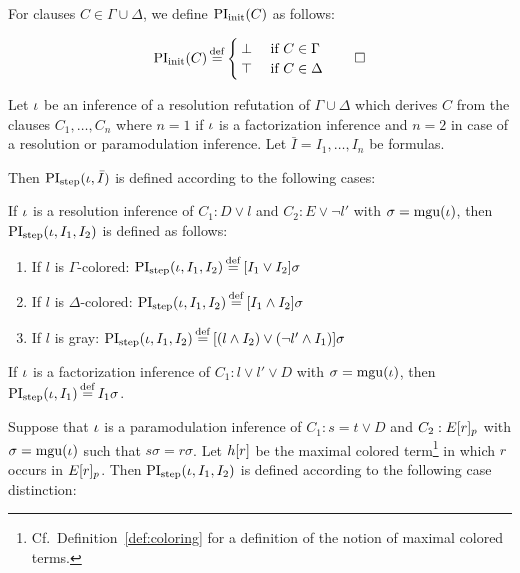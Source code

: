 \begin{defi}[$\PIinit$]
	For clauses $C \in \Gamma\cup\Delta$, we define $\operatorname{PI}_{\mathrm{init}}(C)$ as follows:

	\[\PIinit(C) \defeq
	\begin{cases}
		\bot & \text{ if $C \in \Gamma$} \\
		\top & \text{ if $C \in \Delta$}  
	\end{cases}
	\qedhere
\]
\end{defi}

\begin{defi}[$\PIstep$]
	Let $\iota$ be an inference of a resolution refutation of $\Gamma\cup\Delta$ which derives $C$ from the clauses $C_1, \dots, C_n$ where $n=1$ if $\iota$ is a factorization inference and $n=2$ in case of a resolution or paramodulation inference. 
	Let $\bar I = I_1, \dots, I_n$ be formulas.

	Then $\operatorname{PI}_{\mathrm{step}}(\iota, \bar I)$ is defined according to the following cases:

	\begin{indproof}
		\label{def:PI_resolution}
			If $\iota$ is a resolution inference of $C_1: D \lor l$ and $C_2: E \lor \lnot l'$ with $\sigma = \operatorname{mgu}(\iota)$, then $\operatorname{PI}_{\mathrm{step}}(\iota, I_1, I_2)$ is defined as follows:
			\begin{enumerate}
				\item If $l$ is $\Gamma$-colored: 
					$\PIstep(\inference, I_1, I_2) \defeq{} [I_1 \lor I_2]\sigma$
				\item If $l$ is $\Delta$-colored: 
					$\PIstep(\inference, I_1, I_2) \defeq{} [I_1 \land I_2]\sigma$
				\item If $l$ is gray: 
					$\PIstep(\inference, I_1, I_2) \defeq{} [(l \land I_2) \lor (\lnot l' \land I_1) ]\sigma $
			\end{enumerate}

			If $\iota$ is a factorization inference of $C_1: l \lor l' \lor D$ with $\sigma = \operatorname{mgu}(\iota)$,
			then $\PIstep(\inference, I_1) \defeq I_1\sigma$.

			\label{def:PI_paramod}
			Suppose that $\iota$ is a paramodulation inference of $C_1: s=t \lor D$ and $C_2: E{[r]_{p}}$ 
			with $\sigma = \operatorname{mgu}(\iota)$ such that $s\sigma = r\sigma$.
			Let $h[r]$ be the maximal colored term\footnote{Cf.\ Definition~\ref{def:coloring} for a definition of the notion of maximal colored terms.} in which $r$ occurs in $E{[r]_{p}}$.
			Then $\operatorname{PI}_{\mathrm{step}}(\iota, I_1, I_2)$ is defined according to the following case distinction:


\end{indproof}
\end{defi}
